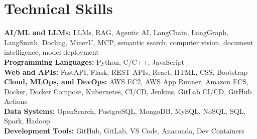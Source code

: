 \section{Technical Skills}
\begin{onecolentry}
\textbf{AI/ML and LLMs:} LLMs, RAG, Agentic AI, LangChain, LangGraph, LangSmith, Docling, MinerU, MCP, semantic search, computer vision, document intelligence, model deployment\\
\textbf{Programming Languages:} Python, C/C++, JavaScript\\
\textbf{Web and APIs:} FastAPI, Flask, REST APIs, React, HTML, CSS, Bootstrap\\
\textbf{Cloud, MLOps, and DevOps:} AWS EC2, AWS App Runner, Amazon ECS, Docker, Docker Compose, Kubernetes, CI/CD, Jenkins, GitLab CI/CD, GitHub Actions\\
\textbf{Data Systems:} OpenSearch, PostgreSQL, MongoDB, MySQL, NoSQL, SQL, Spark, Hadoop\\
\textbf{Development Tools:} GitHub, GitLab, VS Code, Anaconda, Dev Containers
\end{onecolentry}

        
